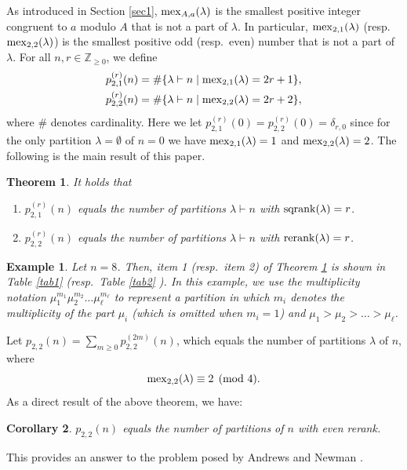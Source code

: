 \documentclass[sn-mathphys-num]{sn-jnl}%
\theoremstyle{thmstyleone}%
\newtheorem{theorem}{Theorem}%
\theoremstyle{thmstyletwo}%
\newtheorem{example}{Example}%
\theoremstyle{thmstylethree}%
\newtheorem{corollary}[theorem]{Corollary}
\begin{document}
As {introduced 
in Section} \ref{sec1}, ${\rm mex}_{A,a}(\lambda)$ is the smallest positive
integer congruent to $a$ modulo $A$ that is not a part of $\lambda$.
In particular, ${\rm mex}_{2,1}(\lambda)$ (resp.~${\rm mex}_{2,2}(\lambda)$) is the smallest 
positive odd (resp.~even) number that is 
not a part of $\lambda$.
%
For all $n ,r \in \mathbb{Z}_{\geq 0}$, we define
\begin{align}
p^{(r)}_{2,1}(n) &= \# \{ \lambda \vdash n \mid {\rm mex}_{2,1}(\lambda) = 2r+1 \}, \\
p^{(r)}_{2,2}(n) &= \# \{ \lambda \vdash n \mid {\rm mex}_{2,2}(\lambda) = 2r+2 \},
\end{align}
where $\#$ denotes cardinality.
Here we let $p^{(r)}_{2,1}(0) = p^{(r)}_{2,2}(0) = \delta_{r,0}$ since
for the only partition $\lambda = \emptyset$ of $n=0$ we have ${\rm mex}_{2,1}(\lambda) = 1$
and ${\rm mex}_{2,2}(\lambda) = 2$.
%
The following is the main result of this paper.
\begin{theorem}\label{th:main}
It holds that
\begin{enumerate}
\item $p^{(r)}_{2,1}(n)$ equals the number of partitions {$\lambda \vdash n$} 
with ${\rm sqrank}(\lambda) =r$.
\item $p^{(r)}_{2,2}(n)$ equals the number of partitions {$\lambda \vdash n$} 
with ${\rm rerank}(\lambda) =r$.
\end{enumerate}
\end{theorem}

\begin{example}
Let $n=8$.
Then, item 1 (resp.~item 2) of Theorem \ref{th:main} is shown in Table \ref{tab1} (resp.~Table \ref{tab2} ).  
In this example, we use the multiplicity notation $\mu_1^{m_1}\mu_2^{m_2}\dots\mu_\ell^{m_\ell}$
to represent a partition
in which $m_i$ denotes the multiplicity of the part
$\mu_i$ (which is omitted when $m_i=1$) and $\mu_1>\mu_2>\dots>\mu_\ell$.
\end{example}


Let $p_{2,2}(n) = \sum_{m \geq 0} p^{(2m)}_{2,2}(n)$, which equals the number of partitions
$\lambda$ of $n$, where
\begin{equation}
{\rm mex}_{2,2}(\lambda) \equiv 2 \pmod{4}.
\end{equation}
As a direct result of the above theorem, we have:
\begin{corollary}\label{coro:2}
$p_{2,2}(n)$ equals the number of partitions of $n$ with even rerank.
\end{corollary}
This {provides an answer to the problem posed} by
Andrews {and} Newman \cite[p.~9, Question II]{AN2020}.
\end{document}

